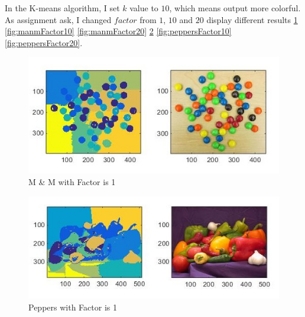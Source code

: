 \documentclass[12pt]{article}
\begin{document}
In the K-means algorithm, I set $k$ value to $10$, which means output more colorful. As assignment ask, I changed $factor$ from $1$, $10$ and $20$ display different results \ref{fig:manmFactor1} \ref{fig:manmFactor10} \ref{fig:manmFactor20} \ref{fig:peppersFactor1} \ref{fig:peppersFactor10} \ref{fig:peppersFactor20}.

\begin{figure}[h]
    \centering
    \includegraphics[width=1\textwidth]{manmFactor1.jpg}
    \caption{M \& M with Factor is 1}
    \label{fig:manmFactor1}
\end{figure}


\begin{figure}[h]
    \centering
    \includegraphics[width=1\textwidth]{peppersFactor1New.jpg}
    \caption{Peppers with Factor is 1}
    \label{fig:peppersFactor1}
\end{figure}

\end{document}
